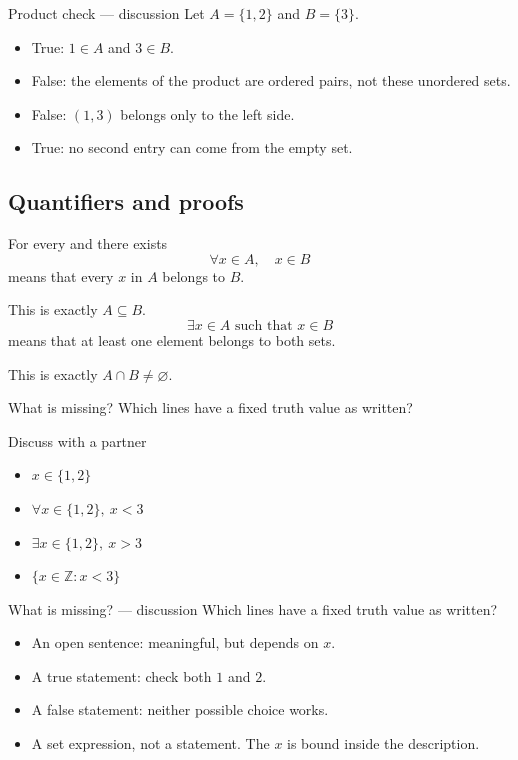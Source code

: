 \documentclass{beamer}
\newcommand{\Z}{\mathbb{Z}}
\begin{document}
\begin{frame}{Product check --- discussion}
Let $A=\{1,2\}$ and $B=\{3\}$.
\begin{itemize}
\item True: $1\in A$ and $3\in B$.
\item False: the elements of the product are ordered pairs, not these unordered sets.
\item False: $(1,3)$ belongs only to the left side.
\item True: no second entry can come from the empty set.
\end{itemize}
\end{frame}
\subsection{Quantifiers and proofs}
\begin{frame}{For every and there exists}
\[\forall x\in A,\quad x\in B\]
means that every $x$ in $A$ belongs to $B$.
\medskip\par This is exactly $A\subseteq B$.
\[\exists x\in A\text{ such that }x\in B\]
means that at least one element belongs to both sets.
\medskip\par This is exactly $A\cap B\ne\varnothing$.
\end{frame}
\begin{frame}{What is missing?}
Which lines have a fixed truth value as written?
\begin{block}{Discuss with a partner}
\begin{itemize}
\item $x\in\{1,2\}$
\item $\forall x\in\{1,2\},\ x<3$
\item $\exists x\in\{1,2\},\ x>3$
\item $\{x\in\Z:x<3\}$
\end{itemize}
\end{block}
\end{frame}
\begin{frame}{What is missing? --- discussion}
Which lines have a fixed truth value as written?
\begin{itemize}
\item An open sentence: meaningful, but depends on $x$.
\item A true statement: check both $1$ and $2$.
\item A false statement: neither possible choice works.
\item A set expression, not a statement. The $x$ is bound inside the description.
\end{itemize}
\end{frame}
\end{document}
